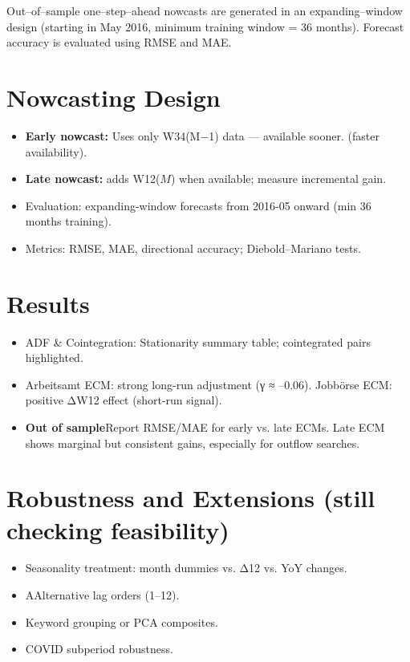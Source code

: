 \documentclass{article}
\begin{document}
Out–of–sample one–step–ahead nowcasts are generated in an expanding–window design
(starting in May 2016, minimum training window = 36 months).  
Forecast accuracy is evaluated using RMSE and MAE.

\section{Nowcasting Design}
\begin{itemize}
  \item \textbf{Early nowcast:} Uses only 
W34(M−1) data — available sooner. (faster availability).
  \item \textbf{Late nowcast:} adds W12($M$) when available; measure incremental gain.
  \item Evaluation: expanding-window forecasts from 2016-05 onward (min 36 months training).
  \item Metrics: RMSE, MAE, directional accuracy; Diebold–Mariano tests.
\end{itemize}



\section{Results}
\begin{itemize}
  \item ADF \& Cointegration: Stationarity summary table; cointegrated pairs highlighted.
  \item Arbeitsamt ECM: strong long-run adjustment (γ ≈ –0.06).
  Jobbörse ECM: positive ΔW12 effect (short-run signal).
  \item \textbf{Out of sample}Report RMSE/MAE for early vs. late ECMs. Late ECM shows marginal but consistent gains, especially for outflow searches.
\end{itemize}




\section{Robustness and Extensions (still checking feasibility)}
\begin{itemize}
  \item Seasonality treatment: month dummies vs. Δ12 vs. YoY changes.
  \item AAlternative lag orders (1–12).
  \item Keyword grouping or PCA composites.
  \item COVID subperiod robustness.
\end{itemize}
\end{document}
